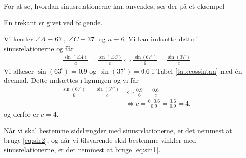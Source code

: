 For at se, hvordan sinusrelationerne kan anvendes, ses der på et eksempel.
\begin{exa}
	En trekant er givet ved følgende.
	\begin{center}
	\end{center}
	Vi kender $\angle A = 63^\circ$, $\angle C = 37^\circ$ og $a = 6$. Vi kan indsætte dette i 
	sinusrelationerne og får
	\begin{align*}
		\frac{\sin(\angle A)}{a} = \frac{\sin(\angle C)}{c} \Leftrightarrow 
		\frac{\sin(67^\circ)}{6} = \frac{\sin(37^\circ)}{c}
	\end{align*}
	Vi aflæser $\sin(63^\circ) = 0.9$ og $\sin(37^\circ) = 0.6$
	 i Tabel \ref{tab:cossintan} med én decimal.
	Dette indsættes i ligningen og vi får
	\begin{align*}
		\frac{\sin(67^\circ)}{6} = \frac{\sin(37^\circ)}{c} &\Leftrightarrow	
		\frac{0.9}{6} = \frac{0.6}{c} \\
		&\Leftrightarrow	 c = \frac{6\cdot 0.6}{0.9} = \frac{3.6}{0.9} = 4,
	\end{align*}
	og derfor er $c = 4$. 
\end{exa} 

Når vi skal bestemme sidelængder med sinusrelationerne, er det nemmest at bruge \eqref{eq:sin2}, og når vi tilsvarende skal bestemme vinkler med sinusrelationerne, er det nemmest at bruge \eqref{eq:sin1}.

